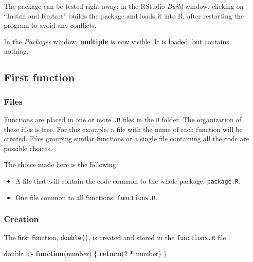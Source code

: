 \documentclass[
  12pt,
  american,
  a4paper,
  extrafontsizes,onecolumn,openright
  ]{memoir}
\newenvironment{Shaded}{\begin{snugshade}}{\end{snugshade}}
\newcommand{\ControlFlowTok}[1]{\textcolor[rgb]{0.13,0.29,0.53}{\textbf{#1}}}
\newcommand{\DecValTok}[1]{\textcolor[rgb]{0.00,0.00,0.81}{#1}}
\newcommand{\FunctionTok}[1]{\textcolor[rgb]{0.13,0.29,0.53}{\textbf{#1}}}
\newcommand{\NormalTok}[1]{#1}
\newcommand{\OtherTok}[1]{\textcolor[rgb]{0.56,0.35,0.01}{#1}}
\newcommand{\SpecialCharTok}[1]{\textcolor[rgb]{0.81,0.36,0.00}{\textbf{#1}}}
\providecommand{\tightlist}{%
  \setlength{\itemsep}{0pt}\setlength{\parskip}{0pt}}
\begin{document}
The package can be tested right away: in the RStudio \emph{Build} window, clicking on \enquote{Install and Restart} builds the package and loads it into R, after restarting the program to avoid any conflicts.

In the \emph{Packages} window, \textbf{multiple} is now visible.
It is loaded, but contains nothing.

\subsection{First function}\label{first-function}

\subsubsection{Files}\label{files}

Functions are placed in one or more \texttt{.R} files in the \texttt{R} folder.
The organization of these files is free.
For this example, a file with the name of each function will be created.
Files grouping similar functions or a single file containing all the code are possible choices.

The choice made here is the following:

\begin{itemize}
\tightlist
\item
  A file that will contain the code common to the whole package: \texttt{package.R}.
\item
  One file common to all functions: \texttt{functions.R}.
\end{itemize}

\subsubsection{Creation}\label{creation-1}

The first function, \texttt{double()}, is created and stored in the \texttt{functions.R} file:

\scriptsize

\begin{Shaded}
\begin{Highlighting}[]
\NormalTok{double }\OtherTok{\textless{}{-}} \ControlFlowTok{function}\NormalTok{(number) \{}
  \FunctionTok{return}\NormalTok{(}\DecValTok{2} \SpecialCharTok{*}\NormalTok{ number)}
\NormalTok{\}}
\end{Highlighting}
\end{Shaded}

\normalsize
\end{document}
